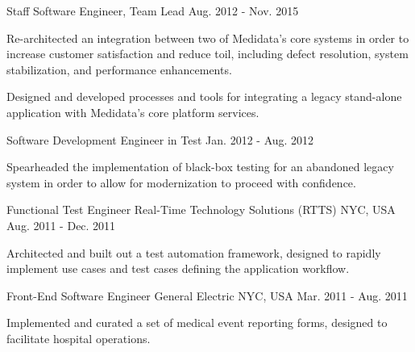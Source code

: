 \begin{cventries}
  \cventry
    {Staff Software Engineer, Team Lead}
    {}
    {}
    {Aug. 2012 - Nov. 2015}
    {
        \begin{cvitems}
          \item {
            Re-architected an integration between two of Medidata's core systems in order to increase customer
            satisfaction and reduce toil, including defect resolution, system stabilization, and
            performance enhancements.
          }
          \item {
            Designed and developed processes and tools for integrating a legacy stand-alone application with Medidata's
            core platform services.
          }
        \end{cvitems}
    }
    
  \cventry
    {Software Development Engineer in Test}
    {}
    {}
    {Jan. 2012 - Aug. 2012}
    {
        \begin{cvitems}
          \item {
            Spearheaded the implementation of black-box testing for an abandoned legacy system in order to allow for
            modernization to proceed with confidence.
          }
        \end{cvitems}
    }
    
  \cventry
    {Functional Test Engineer} %
    {Real-Time Technology Solutions (RTTS)} %
    {NYC, USA} %
    {Aug. 2011 - Dec. 2011} %
    {
      \begin{cvitems} %
        \item {
          Architected and built out a test automation framework, designed to rapidly implement use cases and test
          cases defining the application workflow.
        }
      \end{cvitems}
    }

  \cventry
    {Front-End Software Engineer} %
    {General Electric} %
    {NYC, USA} %
    {Mar. 2011 - Aug. 2011} %
    {
      \begin{cvitems} %
        \item {
          Implemented and curated a set of medical event reporting forms, designed to facilitate hospital operations.
        }
      \end{cvitems}
    }

\end{cventries}
